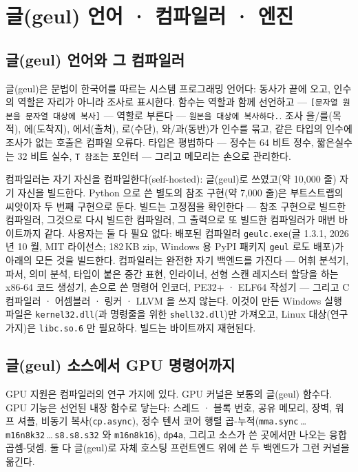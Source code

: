 \documentclass[11pt]{article}
\begin{document}
\section{글(geul) 언어 · 컴파일러 · 엔진}\label{app:geul}

\subsection{글(geul) 언어와 그 컴파일러}

글(geul)은 문법이 한국어를 따르는 시스템 프로그래밍 언어다: 동사가 끝에 오고, 인수의 역할은 자리가 아니라 조사로 표시한다. 함수는
역할과 함께 선언하고 --- \texttt{[문자열 원본을 문자열 대상에 복사]} --- 역할로 부른다 --- \texttt{원본을 대상에 복사하다.}.
조사 을/를(목적), 에(도착지), 에서(출처), 로(수단), 와/과(동반)가 인수를 묶고, 같은 타입의 인수에 조사가 없는 호출은 컴파일
오류다. 타입은 평범하다 --- 정수는 64 비트 정수, 짧은실수는 32 비트 실수, \texttt{T 참조}는 포인터 --- 그리고 메모리는 손으로
관리한다.

컴파일러는 자기 자신을 컴파일한다(self-hosted): 글(geul)로 쓰였고(약 10,000 줄) 자기 자신을 빌드한다. Python 으로 쓴 별도의
참조 구현(약 7,000 줄)은 부트스트랩의 씨앗이자 두 번째 구현으로 둔다. 빌드는 고정점을 확인한다 --- 참조 구현으로 빌드한
컴파일러, 그것으로 다시 빌드한 컴파일러, 그 출력으로 또 빌드한 컴파일러가 매번 바이트까지 같다. 사용자는 둘 다 필요 없다: 배포된
컴파일러 \texttt{geulc.exe}(글 1.3.1, 2026 년 10 월, MIT 라이선스; 182\,KB zip, Windows 용 PyPI 패키지 \texttt{geul} 로도 배포)가
아래의 모든 것을 빌드한다. 컴파일러는 완전한 자기 백엔드를 가진다 --- 어휘 분석기, 파서, 의미 분석, 타입이 붙은 중간 표현,
인라이너, 선형 스캔 레지스터 할당을 하는 x86-64 코드 생성기, 손으로 쓴 명령어 인코더, PE32+ · ELF64 작성기 --- 그리고 C 컴파일러 ·
어셈블러 · 링커 · LLVM 을 쓰지 않는다. 이것이 만든 Windows 실행 파일은 \texttt{kernel32.dll}(과 명령줄을 위한
\texttt{shell32.dll})만 가져오고, Linux 대상(연구 가지)은 \texttt{libc.so.6} 만 필요하다. 빌드는 바이트까지 재현된다.

\subsection{글(geul) 소스에서 GPU 명령어까지}

GPU 지원은 컴파일러의 연구 가지에 있다. GPU 커널은 보통의 글(geul) 함수다. GPU 기능은 선언된 내장 함수로 닿는다: 스레드 · 블록
번호, 공유 메모리, 장벽, 워프 셔플, 비동기 복사(\texttt{cp.async}), 정수 텐서 코어 행렬 곱-누적(\texttt{mma.sync}\,\dots\,%
\texttt{m16n8k32}\,\dots\,\texttt{s8.s8.s32} 와 \texttt{m16n8k16}), \texttt{dp4a}, 그리고 소스가 쓴 곳에서만 나오는 융합
곱셈-덧셈. 둘 다 글(geul)로 자체 호스팅 프런트엔드 위에 쓴 두 백엔드가 그런 커널을 옮긴다.
\end{document}
